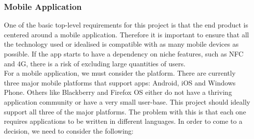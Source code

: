 \subsubsection{Mobile Application}
One of the basic top-level requirements for this project is that the end product is centered around a mobile application.  Therefore it is important to ensure that all the technology used or idealised is compatible with as many mobile devices as possible.  If the app starts to have a dependency on niche features, such as NFC and 4G, there is a risk of excluding large quantities of users.\\
For a mobile application, we must consider the platform.  There are currently three major mobile platforms that support apps: Android, iOS and Windows Phone.  Others like Blackberry and Firefox OS either do not have a thriving application community or have a very small user-base.  This project should ideally support all three of the major platforms.  The problem with this is that each one requires applications to be written in different languages.  In order to come to a decision, we need to consider the following:
